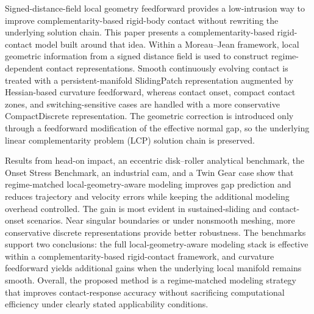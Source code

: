 Signed-distance-field local geometry feedforward provides a low-intrusion way to improve complementarity-based rigid-body contact without rewriting the underlying solution chain. This paper presents a complementarity-based rigid-contact model built around that idea. Within a Moreau--Jean framework, local geometric information from a signed distance field is used to construct regime-dependent contact representations. Smooth continuously evolving contact is treated with a persistent-manifold SlidingPatch representation augmented by Hessian-based curvature feedforward, whereas contact onset, compact contact zones, and switching-sensitive cases are handled with a more conservative CompactDiscrete representation. The geometric correction is introduced only through a feedforward modification of the effective normal gap, so the underlying linear complementarity problem (LCP) solution chain is preserved.

Results from head-on impact, an eccentric disk--roller analytical benchmark, the Onset Stress Benchmark, an industrial cam, and a Twin Gear case show that regime-matched local-geometry-aware modeling improves gap prediction and reduces trajectory and velocity errors while keeping the additional modeling overhead controlled. The gain is most evident in sustained-sliding and contact-onset scenarios. Near singular boundaries or under nonsmooth meshing, more conservative discrete representations provide better robustness. The benchmarks support two conclusions: the full local-geometry-aware modeling stack is effective within a complementarity-based rigid-contact framework, and curvature feedforward yields additional gains when the underlying local manifold remains smooth. Overall, the proposed method is a regime-matched modeling strategy that improves contact-response accuracy without sacrificing computational efficiency under clearly stated applicability conditions.

